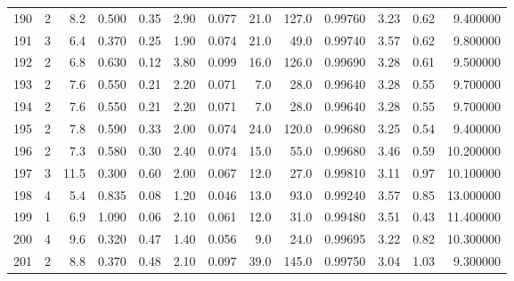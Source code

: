 \begin{tabular}{lrrrrrrrrrrrr}
190  &        2 &            8.2 &             0.500 &         0.35 &            2.90 &      0.077 &                 21.0 &                 127.0 &  0.99760 &  3.23 &       0.62 &   9.400000 \\
191  &        3 &            6.4 &             0.370 &         0.25 &            1.90 &      0.074 &                 21.0 &                  49.0 &  0.99740 &  3.57 &       0.62 &   9.800000 \\
192  &        2 &            6.8 &             0.630 &         0.12 &            3.80 &      0.099 &                 16.0 &                 126.0 &  0.99690 &  3.28 &       0.61 &   9.500000 \\
193  &        2 &            7.6 &             0.550 &         0.21 &            2.20 &      0.071 &                  7.0 &                  28.0 &  0.99640 &  3.28 &       0.55 &   9.700000 \\
194  &        2 &            7.6 &             0.550 &         0.21 &            2.20 &      0.071 &                  7.0 &                  28.0 &  0.99640 &  3.28 &       0.55 &   9.700000 \\
195  &        2 &            7.8 &             0.590 &         0.33 &            2.00 &      0.074 &                 24.0 &                 120.0 &  0.99680 &  3.25 &       0.54 &   9.400000 \\
196  &        2 &            7.3 &             0.580 &         0.30 &            2.40 &      0.074 &                 15.0 &                  55.0 &  0.99680 &  3.46 &       0.59 &  10.200000 \\
197  &        3 &           11.5 &             0.300 &         0.60 &            2.00 &      0.067 &                 12.0 &                  27.0 &  0.99810 &  3.11 &       0.97 &  10.100000 \\
198  &        4 &            5.4 &             0.835 &         0.08 &            1.20 &      0.046 &                 13.0 &                  93.0 &  0.99240 &  3.57 &       0.85 &  13.000000 \\
199  &        1 &            6.9 &             1.090 &         0.06 &            2.10 &      0.061 &                 12.0 &                  31.0 &  0.99480 &  3.51 &       0.43 &  11.400000 \\
200  &        4 &            9.6 &             0.320 &         0.47 &            1.40 &      0.056 &                  9.0 &                  24.0 &  0.99695 &  3.22 &       0.82 &  10.300000 \\
201  &        2 &            8.8 &             0.370 &         0.48 &            2.10 &      0.097 &                 39.0 &                 145.0 &  0.99750 &  3.04 &       1.03 &   9.300000 \\

\end{tabular}
